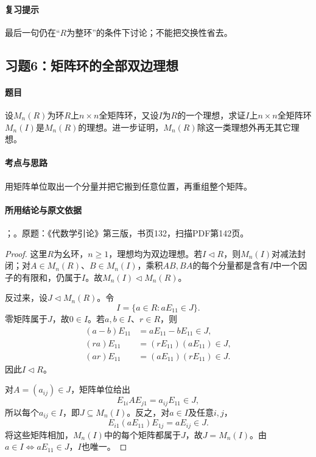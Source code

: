 \paragraph{复习提示}

最后一句仍在“$R$为整环”的条件下讨论；不能把交换性省去。



\subsection{习题6：矩阵环的全部双边理想}

\label{ex:3:6}

\paragraph{题目}

设$M_n(R)$为环$R$上$n\times n$全矩阵环，又设$I$为$R$的一个理想，求证$I$上$n\times n$全矩阵环$M_n(I)$是$M_n(R)$的理想。进一步证明，$M_n(R)$除这一类理想外再无其它理想。

\paragraph{考点与思路}

用矩阵单位取出一个分量并把它搬到任意位置，再重组整个矩阵。

\paragraph{所用结论与原文依据}

；。原题：《代数学引论》第三版，书页132，扫描PDF第142页。


\begin{proof}

这里$R$为幺环，$n\ge1$，理想均为双边理想。若$I\lhd R$，则$M_n(I)$对减法封闭；对$A\in M_n(R)$、$B\in M_n(I)$，乘积$AB,BA$的每个分量都是含有$I$中一个因子的有限和，仍属于$I$。故$M_n(I)\lhd M_n(R)$。

反过来，设$J\lhd M_n(R)$。令
\[
I=\{a\in R:aE_{11}\in J\}.
\]
零矩阵属于$J$，故$0\in I$。若$a,b\in I$、$r\in R$，则
\begin{align*}
(a-b)E_{11}&=aE_{11}-bE_{11}\in J,\\
(ra)E_{11}&=(rE_{11})(aE_{11})\in J,\\
(ar)E_{11}&=(aE_{11})(rE_{11})\in J.
\end{align*}
因此$I\lhd R$。

对$A=(a_{ij})\in J$，矩阵单位给出
\[
E_{1i}AE_{j1}=a_{ij}E_{11}\in J,
\]
所以每个$a_{ij}\in I$，即$J\subseteq M_n(I)$。反之，对$a\in I$及任意$i,j$，
\[
E_{i1}(aE_{11})E_{1j}=aE_{ij}\in J.
\]
将这些矩阵相加，$M_n(I)$中的每个矩阵都属于$J$，故$J=M_n(I)$。由$a\in I\Longleftrightarrow aE_{11}\in J$，$I$也唯一。

\end{proof}

